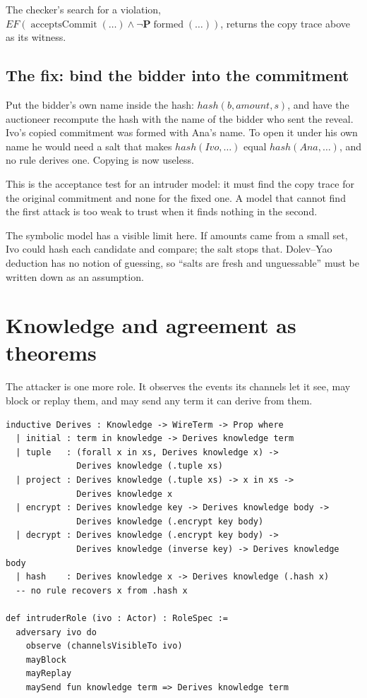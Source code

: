 The checker's search for a violation, $EF(\operatorname{acceptsCommit}(\ldots)
\land \neg\mathbf{P}\operatorname{formed}(\ldots))$, returns the copy trace above
as its witness.

\subsection{The fix: bind the bidder into the commitment}

Put the bidder's own name inside the hash:
$\mathit{hash}(b, \mathit{amount}, s)$, and have the auctioneer recompute the
hash with the name of the bidder who sent the reveal. Ivo's copied commitment
was formed with Ana's name. To open it under his own name he would need a salt
that makes $\mathit{hash}(\mathit{Ivo},\ldots)$ equal $\mathit{hash}(\mathit{Ana},\ldots)$,
and no rule derives one. Copying is now useless.

This is the acceptance test for an intruder model: it must find the copy trace
for the original commitment and none for the fixed one. A model that cannot find
the first attack is too weak to trust when it finds nothing in the second.

The symbolic model has a visible limit here. If amounts came from a small set, Ivo
could hash each candidate and compare; the salt stops that. Dolev--Yao deduction
has no notion of guessing, so ``salts are fresh and unguessable'' must be written
down as an assumption.

\section{Knowledge and agreement as theorems}
\label{sec:knowledge-closure}

The attacker is one more role. It observes the events its channels let it see,
may block or replay them, and may send any term it can derive from them.

\begin{lstlisting}
inductive Derives : Knowledge -> WireTerm -> Prop where
  | initial : term in knowledge -> Derives knowledge term
  | tuple   : (forall x in xs, Derives knowledge x) ->
              Derives knowledge (.tuple xs)
  | project : Derives knowledge (.tuple xs) -> x in xs ->
              Derives knowledge x
  | encrypt : Derives knowledge key -> Derives knowledge body ->
              Derives knowledge (.encrypt key body)
  | decrypt : Derives knowledge (.encrypt key body) ->
              Derives knowledge (inverse key) -> Derives knowledge body
  | hash    : Derives knowledge x -> Derives knowledge (.hash x)
  -- no rule recovers x from .hash x

def intruderRole (ivo : Actor) : RoleSpec :=
  adversary ivo do
    observe (channelsVisibleTo ivo)
    mayBlock
    mayReplay
    maySend fun knowledge term => Derives knowledge term
\end{lstlisting}

